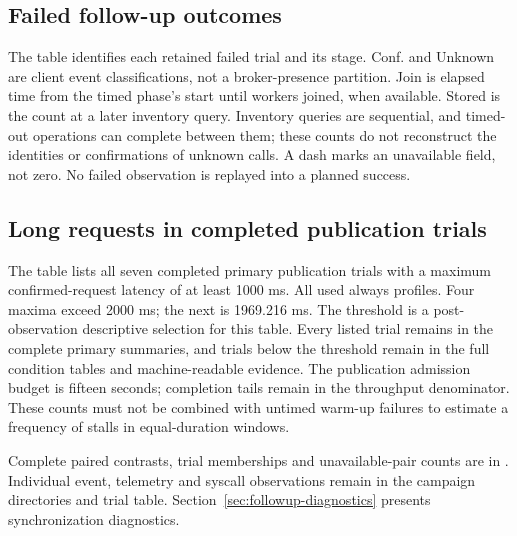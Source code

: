 \FloatBarrier

\subsection{Failed follow-up outcomes}\label{app:followup-failures}
The table identifies each retained failed trial and its stage. Conf. and Unknown are client event classifications, not a broker-presence partition. Join is elapsed time from the timed phase's start until workers joined, when available. Stored is the count at a later inventory query. Inventory queries are sequential, and timed-out operations can complete between them; these counts do not reconstruct the identities or confirmations of unknown calls. A dash marks an unavailable field, not zero. No failed observation is replayed into a planned success.
\begingroup\footnotesize\setlength{\tabcolsep}{3pt}

\endgroup

\begin{table}[htbp]
\centering\footnotesize\setlength{\tabcolsep}{3pt}

\caption{Recorded request waits in each measurement-stage failure. Ranges span unknown requests within the trial. Error classes are returned client errors; these times do not identify broker completion or storage-device latency. The NATS error text is ; the Redis error text ends in .}
\label{tab:publication-timeouts}
\end{table}
\FloatBarrier

\subsection{Long requests in completed publication trials}\label{app:request-maxima}
The table lists all seven completed primary publication trials with a maximum confirmed-request latency of at least 1000 ms. All used always profiles. Four maxima exceed 2000 ms; the next is 1969.216 ms. The threshold is a post-observation descriptive selection for this table. Every listed trial remains in the complete primary summaries, and trials below the threshold remain in the full condition tables and machine-readable evidence. The publication admission budget is fifteen seconds; completion tails remain in the throughput denominator. These counts must not be combined with untimed warm-up failures to estimate a frequency of stalls in equal-duration windows.
\begin{table}[htbp]
\centering\small

\caption{Largest confirmed-request latency in each completed primary publication trial meeting the descriptive 1000 ms threshold.}
\label{tab:publication-request-maxima}
\end{table}
\FloatBarrier

Complete paired contrasts, trial memberships and unavailable-pair counts are in . Individual event, telemetry and syscall observations remain in the campaign directories and trial table. Section~\ref{sec:followup-diagnostics} presents synchronization diagnostics.
\FloatBarrier
